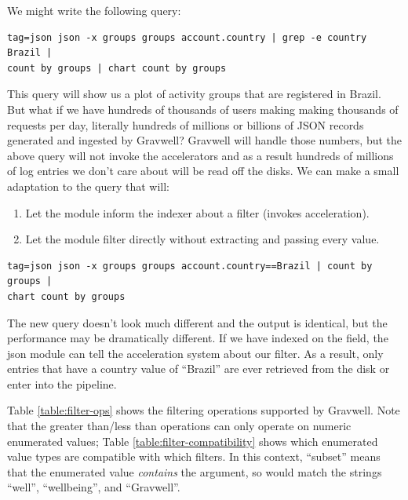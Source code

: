 We might write the following query:

\begin{Verbatim}[breaklines=true]
tag=json json -x groups groups account.country | grep -e country Brazil |
count by groups | chart count by groups
\end{Verbatim}

This query will show us a plot of activity groups that are registered
in Brazil. But what if we
have hundreds of thousands of users making making thousands of requests
per day, literally hundreds of millions or billions of JSON records
generated and ingested by Gravwell? Gravwell will handle those numbers,
but the above query will not invoke the accelerators and as a result
hundreds of millions of log entries we don't care about will be read off the disks.
We can make a small adaptation to the query that will:

\begin{enumerate}
\item
  Let the  module inform the indexer about a filter (invokes
  acceleration).
\item
  Let the  module filter directly without extracting and
  passing every value.
\end{enumerate}

\begin{Verbatim}[breaklines=true]
tag=json json -x groups groups account.country==Brazil | count by groups |
chart count by groups
\end{Verbatim}

The new query doesn't look much different and the output is identical,
but the performance may be dramatically different. If we have indexed
on the  field, the json module can tell the acceleration system
about our filter. As a result, only entries that have a country value of
``Brazil'' are ever retrieved from the disk or enter into the
pipeline.

Table \ref{table:filter-ops} shows the filtering operations supported by Gravwell. Note that the greater than/less than operations can only operate on numeric enumerated values; Table \ref{table:filter-compatibility} shows which enumerated value types are compatible with which filters. In this context, ``subset'' means that the enumerated value \emph{contains} the argument, so  would match the strings ``well'', ``wellbeing'', and ``Gravwell''.

